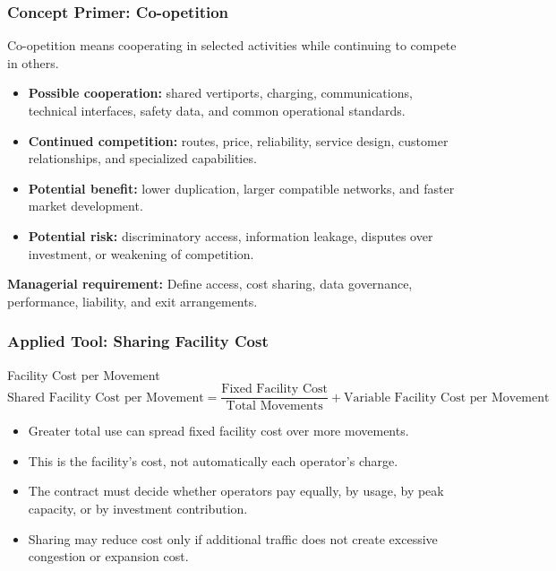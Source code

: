 \documentclass{beamer}
\begin{document}
\begin{frame}[t]
\frametitle{Concept Primer: Co-opetition}
Co-opetition means cooperating in selected activities while continuing to compete in others.
\begin{itemize}
\item \textbf{Possible cooperation:} shared vertiports, charging, communications, technical interfaces, safety data, and common operational standards.
\item \textbf{Continued competition:} routes, price, reliability, service design, customer relationships, and specialized capabilities.
\item \textbf{Potential benefit:} lower duplication, larger compatible networks, and faster market development.
\item \textbf{Potential risk:} discriminatory access, information leakage, disputes over investment, or weakening of competition.
\end{itemize}
\textbf{Managerial requirement:} Define access, cost sharing, data governance, performance, liability, and exit arrangements.
\end{frame}

\begin{frame}[t]
\frametitle{Applied Tool: Sharing Facility Cost}
\begin{block}{Facility Cost per Movement}
\[
\text{Shared Facility Cost per Movement}
=
\frac{\text{Fixed Facility Cost}}{\text{Total Movements}}
+\text{Variable Facility Cost per Movement}
\]
\end{block}
\begin{itemize}
\item Greater total use can spread fixed facility cost over more movements.
\item This is the facility's cost, not automatically each operator's charge.
\item The contract must decide whether operators pay equally, by usage, by peak capacity, or by investment contribution.
\item Sharing may reduce cost only if additional traffic does not create excessive congestion or expansion cost.
\end{itemize}
\end{frame}
\end{document}
